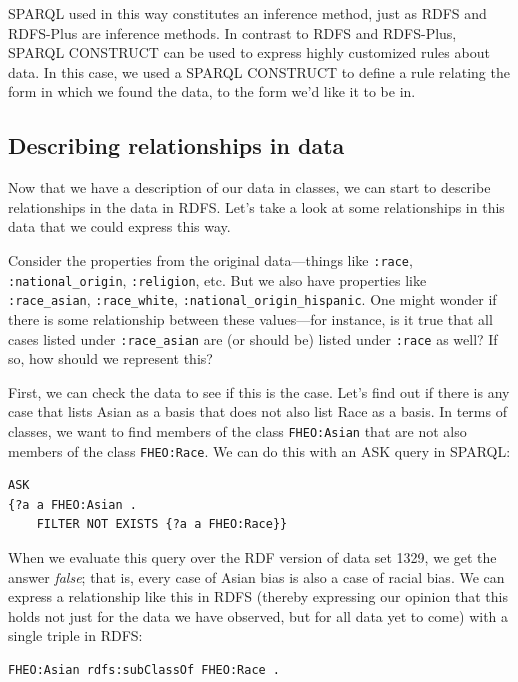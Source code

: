 SPARQL used in this way constitutes an inference method, just as RDFS
and RDFS-Plus are inference methods. In contrast to RDFS and RDFS-Plus,
SPARQL CONSTRUCT can be used to express highly customized rules about
data. In this case, we used a SPARQL CONSTRUCT to define a rule relating
the form in which we found the data, to the form we'd like it to be in.

\subsection{Describing relationships in data}

Now that we have a description of our data in classes, we can start to
describe relationships in the data in RDFS. Let's take a look at some
relationships in this data that we could express this way.

Consider the properties from the original data---things like \texttt{:race},
\texttt{:national\_origin},
\texttt{:religion}, etc. But we also have properties like \texttt{:race\_asian},
\texttt{:race\_white},
\texttt{:national\_origin\_hispanic}. One might wonder if there is some
relationship between these
values---for instance, is it true that all cases listed under
\texttt{:race\_asian} are (or should be) listed under
\texttt{:race} as well? If so, how should we represent this?

First, we can check the data to see if this is the case. Let's find out
if there is any case that lists Asian as a basis that does not also list
Race as a basis. In terms of classes, we want to find members of the
class \texttt{FHEO:Asian} that are not also members of the class \texttt{FHEO:Race}. We
can do this with an ASK query in SPARQL:

\begin{lstlisting}
ASK
{?a a FHEO:Asian .
    FILTER NOT EXISTS {?a a FHEO:Race}}
\end{lstlisting}

When we evaluate this query over the RDF version of data set 1329, we
get the answer \textit{false}; that is, every case of Asian bias is also a case
of racial bias. We can express a relationship like this in RDFS (thereby
expressing our opinion that this holds not just for the data we have
observed, but for all data yet to come) with a single triple in RDFS:

\begin{lstlisting}
FHEO:Asian rdfs:subClassOf FHEO:Race .
\end{lstlisting}

